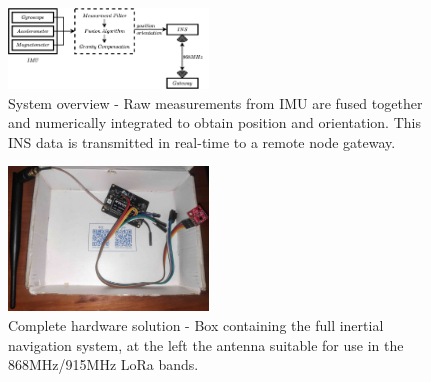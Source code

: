 \begin{figure}[!h]
    \centering
    \includegraphics[width=0.475\textwidth]{figures/overview.pdf}
    \caption{System overview - Raw measurements from IMU are fused together and numerically integrated to obtain position and orientation. This INS data is transmitted in real-time to a remote node gateway. }
    \label{fig:overview}
\end{figure}

\begin{figure}[!h]
    \centering
    \includegraphics[width=0.475\textwidth]{figures/fullINS.jpg}
    \caption{Complete hardware solution - Box containing the full inertial navigation system, at the left the antenna  suitable for use in the 868MHz/915MHz LoRa bands. }
    \label{fig:full}
\end{figure}




